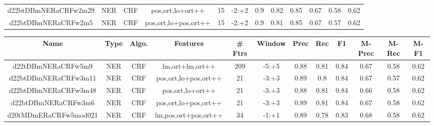 \documentclass[a4paper]{article}
\begin{document}
\begin{landscape}
\begin{center}
\begin{tabular}{ |c|c|c|c|c|c|c|c|c|c|c|c|}
 
 	
 	\small{ d22btDBmNERaCRFw2m29 } & \small{ NER} & \small{  CRF }  & pos,ort,lo+ort++  &  15 &  \small{  -2:+2 }  &  0.9 & 0.82 & 0.85  &  0.67 & 0.58 & 0.62 \\
 	

 
 	
 	\small{ d22btDBmNERaCRFw2m5 } & \small{ NER} & \small{  CRF }  & pos,ort,lo+pos,ort++  &  15 &  \small{  -2:+2 }  &  0.9 & 0.81 & 0.85  &  0.67 & 0.57 & 0.62 \\
 	
 \hline
\end{tabular}
\end{center}




\begin{center}
\begin{tabular}{ |c|c|c|c|c|c|c|c|c|c|c|c|} 
 \hline
 	Name & Type & Algo. & Features & \# Ftrs & Window & Prec & Rec & F1 & M-Prec & M-Rec & M-F1\\
 \hline

 	

 
 	
 	\small{ d22tDBmNERaCRFw5m9 } & \small{ NER} & \small{  CRF }  & lm,ort+lm,ort++  &  209 &  \small{  -5:+5 }  &  0.88 & 0.81 & 0.84  &  0.67 & 0.58 & 0.62 \\
 	

 
 	
 	\small{ d22btDBmNERaCRFw3m11 } & \small{ NER} & \small{  CRF }  & pos,ort,lo+pos,ort++  &  21 &  \small{  -3:+3 }  &  0.89 & 0.8 & 0.84  &  0.67 & 0.57 & 0.62 \\
 	

 
 	
 	\small{ d22btDBmNERaCRFw3m48 } & \small{ NER} & \small{  CRF }  & pos,ort,lo+ort++  &  21 &  \small{  -3:+3 }  &  0.88 & 0.81 & 0.84  &  0.66 & 0.58 & 0.62 \\
 	

 
 	
 	\small{ d22btDBmNERaCRFw3m6 } & \small{ NER} & \small{  CRF }  & pos,ort,lo+pos,ort++  &  21 &  \small{  -3:+3 }  &  0.89 & 0.81 & 0.84  &  0.67 & 0.58 & 0.62 \\
 	

 
 	
 	\small{ d20tMDmERaCRFw5mod021 } & \small{ NER} & \small{  CRF }  & lm,pos,ort+pos,ort++  &  34 &  \small{  -1:+1 }  &  0.89 & 0.78 & 0.83  &  0.68 & 0.58 & 0.62 \\
 	


\end{tabular}
\end{center}
\end{landscape}
\end{document}
